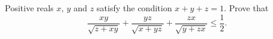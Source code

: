 \problem{}
Positive reals $x$, $y$ and $z$ satisfy the condition $x + y + z = 1$.
Prove that
\[
    \frac{x y}{\sqrt{z + x y}}
    +
    \frac{y z}{\sqrt{x + y z}}
    +
    \frac{z x}{\sqrt{y + z x}}
\leq
    \frac{1}{2}
.\]
\solution
\endproblem
